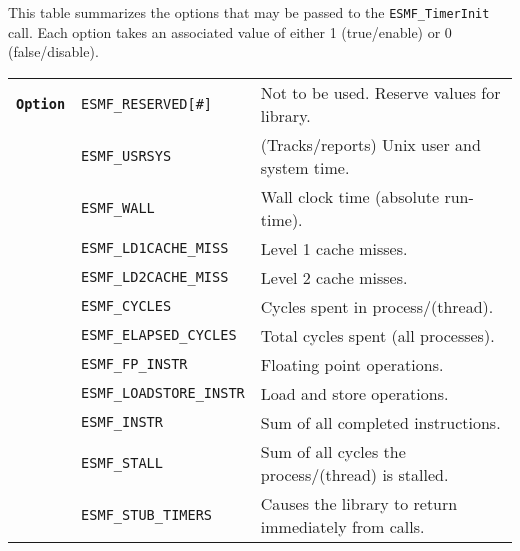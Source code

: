 

This table summarizes the options that may be passed to the
{\tt ESMF\_TimerInit} call.  Each option takes an associated value of
either 1 (true/enable) or 0 (false/disable).
\smallskip

\begin{tabular}{lll}
{\tt \bf Option} & {\tt ESMF\_RESERVED[\#]} & Not to be used.  Reserve values for library. \\
                 & {\tt ESMF\_USRSYS} & (Tracks/reports) Unix user and system time.  \\
                 & {\tt ESMF\_WALL} & Wall clock time (absolute run-time).  \\
                 & {\tt ESMF\_LD1CACHE\_MISS} & Level 1 cache misses.  \\
                 & {\tt ESMF\_LD2CACHE\_MISS} & Level 2 cache misses.  \\
                 & {\tt ESMF\_CYCLES} & Cycles spent in process/(thread).  \\
                 & {\tt ESMF\_ELAPSED\_CYCLES} & Total cycles spent (all processes).  \\
                 & {\tt ESMF\_FP\_INSTR} & Floating point operations. \\
                 & {\tt ESMF\_LOADSTORE\_INSTR} & Load and store operations. \\
                 & {\tt ESMF\_INSTR} & Sum of all completed instructions. \\
                 & {\tt ESMF\_STALL} & Sum of all cycles the process/(thread) is stalled. \\
                 & {\tt ESMF\_STUB\_TIMERS} & Causes the library to return immediately from calls. \\
\end{tabular}
